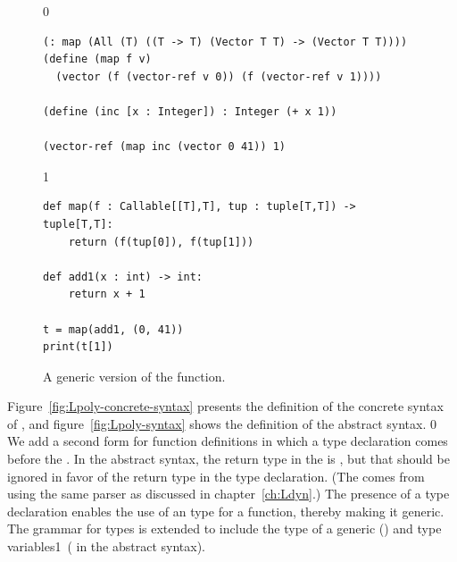 \documentclass[7x10]{TimesAPriori_MIT}%
\def\racketEd{0}
\def\pythonEd{1}
\def\edition{1}
\newcommand{\pythonColor}[0]{}
\newcommand{\python}[1]{{\if\edition\pythonEd\pythonColor #1\fi}}
\numberwithin{theorem}{chapter}
\numberwithin{definition}{chapter}
\numberwithin{equation}{chapter}
\begin{document}
\begin{figure}[tbp]
\begin{tcolorbox}[colback=white]  
{\if\edition\racketEd
\begin{lstlisting}
(: map (All (T) ((T -> T) (Vector T T) -> (Vector T T))))
(define (map f v)
  (vector (f (vector-ref v 0)) (f (vector-ref v 1))))

(define (inc [x : Integer]) : Integer (+ x 1))

(vector-ref (map inc (vector 0 41)) 1)
\end{lstlisting}
\fi}
{\if\edition\pythonEd\pythonColor
\begin{lstlisting}
def map(f : Callable[[T],T], tup : tuple[T,T]) -> tuple[T,T]:
    return (f(tup[0]), f(tup[1]))

def add1(x : int) -> int:
    return x + 1

t = map(add1, (0, 41))
print(t[1])
\end{lstlisting}
\fi}
\end{tcolorbox}

\caption{A generic version of the  function.}
\label{fig:map-poly}
\end{figure}

Figure~\ref{fig:Lpoly-concrete-syntax} presents the definition of the
concrete syntax of \LangPoly{}, and figure~\ref{fig:Lpoly-syntax}
shows the definition of the abstract syntax.
%
{\if\edition\racketEd
We add a second form for function definitions in which a type
declaration comes before the . In the abstract syntax,
the return type in the  is \CANYTY{}, but that should be
ignored in favor of the return type in the type declaration.  (The
\CANYTY{} comes from using the same parser as discussed in
chapter~\ref{ch:Ldyn}.)  The presence of a type declaration
enables the use of an  type for a function, thereby making
it generic.
\fi}
%
The grammar for types is extended to include the type of a generic
() and type variables\python{\ ( in the
  abstract syntax)}.

\newcommand{\LpolyGrammarRacket}{
\begin{array}{lcl}
  \Type &::=& \LP\key{All}~\LP\Var\ldots\RP~ \Type\RP \MID \Var \\
  \Def &::=& \LP\key{:}~\Var~\Type\RP \\
    &&       \LP\key{define}~ \LP\Var ~ \Var\ldots\RP ~ \Exp\RP 
\end{array}
}

\newcommand{\LpolyASTRacket}{
\begin{array}{lcl}
  \Type &::=& \LP\key{All}~\LP\Var\ldots\RP~ \Type\RP \MID \Var \\
  \Def &::=& \DECL{\Var}{\Type} \\
   &&  \DEF{\Var}{\LP\Var \ldots\RP}{\key{'Any}}{\code{'()}}{\Exp}  
\end{array}
}  
\end{document}
